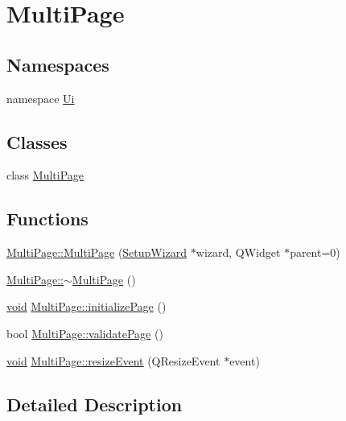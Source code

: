 \hypertarget{group___multi_page}{\section{Multi\-Page}
\label{group___multi_page}
}
\subsection*{Namespaces}
\begin{DoxyCompactItemize}
\item 
namespace \hyperlink{namespace_ui}{Ui}
\end{DoxyCompactItemize}
\subsection*{Classes}
\begin{DoxyCompactItemize}
\item 
class \hyperlink{class_multi_page}{Multi\-Page}
\end{DoxyCompactItemize}
\subsection*{Functions}
\begin{DoxyCompactItemize}
\item 
\hyperlink{group___multi_page_ga67a3b947f1068a2da86e80b181056859}{Multi\-Page\-::\-Multi\-Page} (\hyperlink{class_setup_wizard}{Setup\-Wizard} $\ast$wizard, Q\-Widget $\ast$parent=0)
\item 
\hyperlink{group___multi_page_ga6823cea164d1876265dc9606cc878278}{Multi\-Page\-::$\sim$\-Multi\-Page} ()
\item 
\hyperlink{group___u_a_v_objects_plugin_ga444cf2ff3f0ecbe028adce838d373f5c}{void} \hyperlink{group___multi_page_gae0380b77afc297043f95c8807031e3dc}{Multi\-Page\-::initialize\-Page} ()
\item 
bool \hyperlink{group___multi_page_ga07b9bef6a8d037baebbb6ca9470c6a48}{Multi\-Page\-::validate\-Page} ()
\item 
\hyperlink{group___u_a_v_objects_plugin_ga444cf2ff3f0ecbe028adce838d373f5c}{void} \hyperlink{group___multi_page_ga29d29742f1cbfe57833315d3d48f9215}{Multi\-Page\-::resize\-Event} (Q\-Resize\-Event $\ast$event)
\end{DoxyCompactItemize}


\subsection{Detailed Description}


